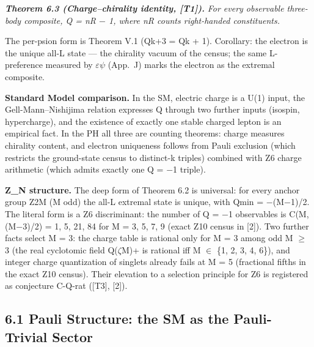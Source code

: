 \documentclass[11pt,letterpaper]{article}
\begin{document}
\noindent \textbf{\textit{Theorem 6.3 (Charge--chirality identity, [T1]). }}\textit{For every observable three-body composite, Q = nR $-$ 1, where nR counts right-handed constituents.}

\noindent The per-psion form is Theorem V.1 (Qk+3 = Qk + 1). Corollary: the electron is the unique all-L state --- the chirality vacuum of the census; the same L-preference measured by $\varepsilon$$\psi$ (App.~J) marks the electron as the extremal composite.

\noindent \textbf{Standard Model comparison. }In the SM, electric charge is a U(1) input, the Gell-Mann--Nishijima relation expresses Q through two further inputs (isospin, hypercharge), and the existence of exactly one stable charged lepton is an empirical fact. In the PH all three are counting theorems: charge measures chirality content, and electron uniqueness follows from Pauli exclusion (which restricts the ground-state census to distinct-k triples) combined with Z6 charge arithmetic (which admits exactly one Q = $-$1 triple).

\noindent \textbf{Z\_N structure. }The deep form of Theorem 6.2 is universal: for every anchor group Z2M (M odd) the all-L extremal state is unique, with Qmin = $-$(M$-$1)/2. The literal form is a Z6 discriminant: the number of Q = $-$1 observables is C(M, (M$-$3)/2) = 1, 5, 21, 84 for M = 3, 5, 7, 9 (exact Z10 census in [2]). Two further facts select M = 3: the charge table is rational only for M = 3 among odd M $\ge$ 3 (the real cyclotomic field Q($\zeta$M)+ is rational iff M $\in$ \{1, 2, 3, 4, 6\}), and integer charge quantization of singlets already fails at M = 5 (fractional fifths in the exact Z10 census). Their elevation to a selection principle for Z6 is registered as conjecture C-Q-rat ([T3], [2]).

\subsection*{6.1  Pauli Structure: the SM as the Pauli-Trivial Sector}
\end{document}
